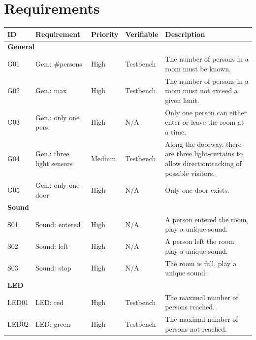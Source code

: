 \documentclass[12pt,a4 paper] {report}
\begin{document}
\newpage

\chapter{Requirements}
\begin{center}
	\begin{tabular}{|p{1.5cm}|p{3.5cm}|p{1.5cm}|p{2cm}|p{5.5cm}|}
		\hline
		\textbf{ID} & \textbf{Requirement} & \textbf{Priority} & \textbf{Verifiable} & \textbf{Description} \\
		\hline
		\multicolumn{5}{|l|}{\textbf{General}} \\
		\hline
		G01 & Gen.: \#persons &  High &  Testbench & The number of persons in a room must be known. \\
		\hline
		G02 & Gen.: max & High &  Testbench & The number of persons in a room must not exceed a given limit. \\
		\hline
		G03 & Gen.: only one pers. & High & N/A & Only one person can either enter or leave the room at a time. \\
		\hline
		G04 & Gen.: three light sensors & Medium & Testbench & Along the doorway, there are three light-curtains to allow directiontracking of possible visitors. \\
		\hline
		G05 & Gen.: only one door & High & N/A & Only one door exists. \\
		\hline
		\multicolumn{5}{|l|}{\textbf{Sound}} \\
		\hline
		S01 & Sound: entered & High & N/A & A person entered the room, play a unique sound. \\
		\hline
		S02 & Sound: left & High & N/A & A person left the room, play a unique sound. \\
		\hline
		S03 & Sound: stop & High & N/A & The room is full, play a unique sound. \\
		\hline
		\multicolumn{5}{|l|}{\textbf{LED}} \\
		\hline
		LED01 & LED: red &  High & Testbench & The maximal number of persons reached. \\
		\hline
		LED02 & LED: green & High & Testbench & The maximal number of persons not reached. \\
		\hline
	\end{tabular}
\end{center}
\end{document}

